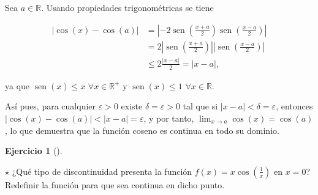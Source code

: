 \documentclass[
  spanish,
  a4paper,
]{scrreport}
\theoremstyle{definition}
\newtheorem{exercise}{Ejercicio}[chapter]
\theoremstyle{remark}
\begin{document}
\begin{tcolorbox}[enhanced jigsaw, arc=.35mm, bottomrule=.15mm, bottomtitle=1mm, breakable, colback=white, colbacktitle=quarto-callout-tip-color!10!white, colframe=quarto-callout-tip-color-frame, coltitle=black, left=2mm, leftrule=.75mm, opacityback=0, opacitybacktitle=0.6, rightrule=.15mm, title=\textcolor{quarto-callout-tip-color}{\faLightbulb}\hspace{0.5em}{Solución}, titlerule=0mm, toprule=.15mm, toptitle=1mm]

Sea \(a\in\mathbb{R}\). Usando propiedades trigonométricas se tiene

\begin{align*}
|\cos(x)-\cos(a)|
&=|-2\operatorname{sen}\left(\frac{x+a}{2}\right)\operatorname{sen}\left(\frac{x-a}{2}\right)| \\
&= 2|\operatorname{sen}\left(\frac{x+a}{2}\right)||\operatorname{sen}\left(\frac{x-a}{2}\right)| \\
&\leq 2\frac{|x-a|}{2}=|x-a|,
\end{align*}

ya que \(\operatorname{sen}(x)\leq x\) \(\forall x\in\mathbb{R}^+\) y
\(\operatorname{sen}(x)\leq 1\) \(\forall x\in\mathbb{R}\).

Así pues, para cualquier \(\varepsilon>0\) existe
\(\delta=\varepsilon>0\) tal que si \(|x-a|<\delta=\varepsilon\),
entonces \(|\cos(x)-\cos(a)|<|x-a|=\varepsilon\), y por tanto,
\(\lim_{x\to a}\cos(x) = \cos(a)\), lo que demuestra que la función
coseno es continua en todo su dominio.

\end{tcolorbox}

\begin{exercise}[]\protect\hypertarget{exr-discontinuidad-evitable}{}\label{exr-discontinuidad-evitable}

\(\star\) ¿Qué tipo de discontinuidad presenta la función
\(f(x)=x\cos\left(\frac{1}{x}\right)\) en \(x=0\)? Redefinir la función
para que sea continua en dicho punto.

\end{exercise}
\end{document}

